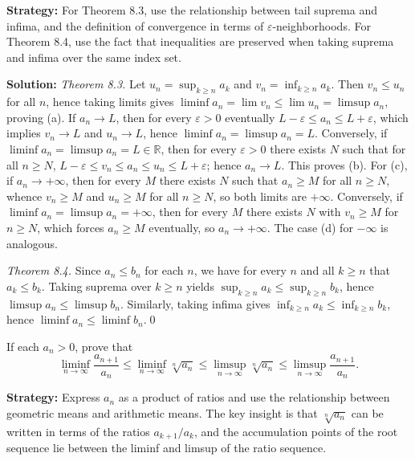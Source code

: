 \noindent\textbf{Strategy:} For Theorem 8.3, use the relationship between tail suprema and infima, and the definition of convergence in terms of \(\varepsilon\)-neighborhoods. For Theorem 8.4, use the fact that inequalities are preserved when taking suprema and infima over the same index set.


\bigskip\noindent\textbf{Solution:}
\emph{Theorem 8.3.} Let \(u_n=\sup_{k\ge n} a_k\) and \(v_n=\inf_{k\ge n} a_k\). Then \(v_n\le u_n\) for all \(n\), hence taking limits gives \(\liminf a_n=\lim v_n\le \lim u_n=\limsup a_n\), proving (a). If \(a_n\to L\), then for every \(\varepsilon>0\) eventually \(L-\varepsilon\le a_n\le L+\varepsilon\), which implies \(v_n\to L\) and \(u_n\to L\), hence \(\liminf a_n=\limsup a_n=L\). Conversely, if \(\liminf a_n=\limsup a_n=L\in\mathbb{R}\), then for every \(\varepsilon>0\) there exists \(N\) such that for all \(n\ge N\), \(L-\varepsilon\le v_n\le a_n\le u_n\le L+\varepsilon\); hence \(a_n\to L\). This proves (b). For (c), if \(a_n\to +\infty\), then for every \(M\) there exists \(N\) such that \(a_n\ge M\) for all \(n\ge N\), whence \(v_n\ge M\) and \(u_n\ge M\) for all \(n\ge N\), so both limits are \(+\infty\). Conversely, if \(\liminf a_n=\limsup a_n=+\infty\), then for every \(M\) there exists \(N\) with \(v_n\ge M\) for \(n\ge N\), which forces \(a_n\ge M\) eventually, so \(a_n\to +\infty\). The case (d) for \(-\infty\) is analogous.

\emph{Theorem 8.4.} Since \(a_n\le b_n\) for each \(n\), we have for every \(n\) and all \(k\ge n\) that \(a_k\le b_k\). Taking suprema over \(k\ge n\) yields \(\sup_{k\ge n} a_k\le \sup_{k\ge n} b_k\), hence \(\limsup a_n\le \limsup b_n\). Similarly, taking infima gives \(\inf_{k\ge n} a_k\le \inf_{k\ge n} b_k\), hence \(\liminf a_n\le \liminf b_n\).\qed


\begin{problembox}
If each \(a_n > 0\), prove that
\[\liminf_{n \to \infty} \frac{a_{n+1}}{a_n} \leq \liminf_{n \to \infty} \sqrt[n]{a_n} \leq \limsup_{n \to \infty} \sqrt[n]{a_n} \leq \limsup_{n \to \infty} \frac{a_{n+1}}{a_n}.\]
\end{problembox}

\noindent\textbf{Strategy:} Express \(a_n\) as a product of ratios and use the relationship between geometric means and arithmetic means. The key insight is that \(\sqrt[n]{a_n}\) can be written in terms of the ratios \(a_{k+1}/a_k\), and the accumulation points of the root sequence lie between the liminf and limsup of the ratio sequence.

